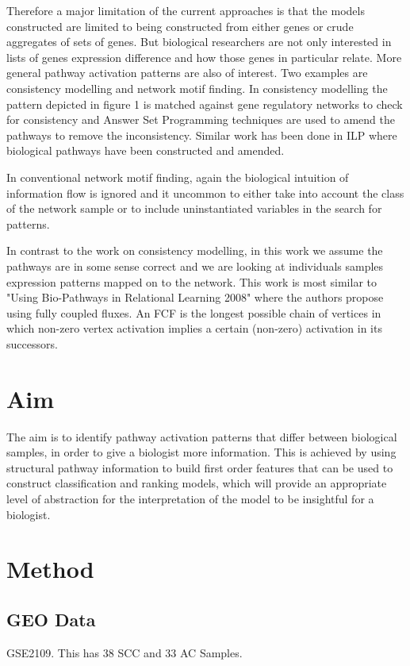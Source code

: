 \documentclass[runningheads,a4paper]{llncs}
\begin{document}
Therefore a major limitation of the current approaches is that the models constructed are limited to being constructed from either genes or crude aggregates of sets of genes. But biological researchers are not only interested in lists of genes expression difference and how those genes in particular relate. More general pathway activation patterns are also of interest. Two examples are consistency modelling and network motif finding.
In consistency modelling the pattern depicted in figure 1 is matched against gene regulatory networks to check for consistency and Answer Set Programming techniques are used to amend the pathways to remove the inconsistency. Similar work has been done in ILP where biological pathways have been constructed and amended. 
 
In conventional network motif finding, again the biological intuition of information flow is ignored and it uncommon to either take into account the class of the network sample or to include uninstantiated variables in the search for patterns. 

In contrast to the work on consistency modelling, in this work we assume the pathways are in some sense correct and we are looking at individuals samples expression patterns mapped on to the network. This work is most similar to  "Using Bio-Pathways in Relational Learning 2008" where the authors propose using fully coupled fluxes. An FCF is the longest possible chain of vertices in which non-zero vertex activation implies a certain (non-zero) activation in its successors.

\section{Aim}
The aim is to identify pathway activation patterns that differ between biological samples, in order to give a biologist more information. This is achieved by using structural pathway information to build first order features that can be used to construct classification and ranking models, which will provide an appropriate level of abstraction for the interpretation of the model to be insightful for a biologist. 

	  
\section{Method}
\subsection{GEO Data}
GSE2109. This has 38 SCC and 33 AC Samples. 
	
\end{document}
